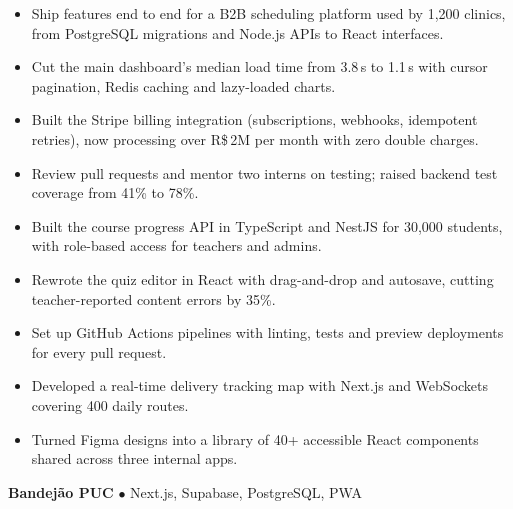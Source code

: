 \begin{itemize}
\item Ship features end to end for a B2B scheduling platform used by 1,200 clinics, from PostgreSQL migrations and Node.js APIs to React interfaces.
\item Cut the main dashboard's median load time from 3.8\,s to 1.1\,s with cursor pagination, Redis caching and lazy-loaded charts.
\item Built the Stripe billing integration (subscriptions, webhooks, idempotent retries), now processing over R\$\,2M per month with zero double charges.
\item Review pull requests and mentor two interns on testing; raised backend test coverage from 41\% to 78\%.
\end{itemize}
\vspace{3pt}
\begin{itemize}
\item Built the course progress API in TypeScript and NestJS for 30,000 students, with role-based access for teachers and admins.
\item Rewrote the quiz editor in React with drag-and-drop and autosave, cutting teacher-reported content errors by 35\%.
\item Set up GitHub Actions pipelines with linting, tests and preview deployments for every pull request.
\end{itemize}
\vspace{3pt}
\begin{itemize}
\item Developed a real-time delivery tracking map with Next.js and WebSockets covering 400 daily routes.
\item Turned Figma designs into a library of 40+ accessible React components shared across three internal apps.
\end{itemize}
\textbf{Bandejão PUC} $\bullet$ Next.js, Supabase, PostgreSQL, PWA
